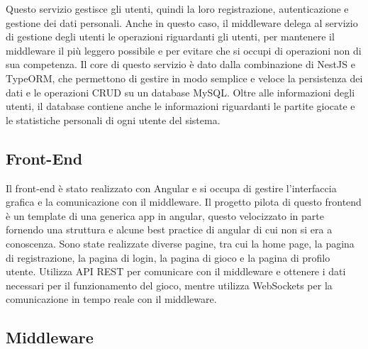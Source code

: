 Questo servizio gestisce gli utenti, quindi la loro registrazione, autenticazione e gestione dei dati personali.
Anche in questo caso, il middleware delega al servizio di gestione degli utenti le operazioni riguardanti gli utenti, per mantenere il middleware il più leggero possibile e per evitare che si occupi di operazioni non di sua competenza.
Il core di questo servizio è dato dalla combinazione di NestJS e TypeORM, che permettono di gestire in modo semplice e veloce la persistenza dei dati e le operazioni CRUD su un database MySQL.
Oltre alle informazioni degli utenti, il database contiene anche le informazioni riguardanti le partite giocate e le statistiche personali di ogni utente del sistema.

\subsection{Front-End}

Il front-end è stato realizzato con Angular e si occupa di gestire l'interfaccia grafica e la comunicazione con il middleware.
Il progetto pilota di questo frontend è un template di una generica app in angular, questo velocizzato in parte fornendo una struttura e alcune best practice di angular di cui non si era a conoscenza. 
Sono state realizzate diverse pagine, tra cui la home page, la pagina di registrazione, la pagina di login, la pagina di gioco e la pagina di profilo utente.
Utilizza API REST per comunicare con il middleware e ottenere i dati necessari per il funzionamento del gioco, mentre utilizza WebSockets per la comunicazione in tempo reale con il middleware. 


\subsection{Middleware}


